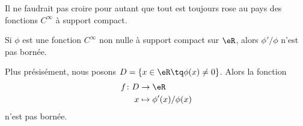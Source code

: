 Il ne faudrait pas croire pour autant que tout est toujours rose au pays des fonctions \(  C^{\infty}\) à support compact.

\begin{proposition}
	Si \( \phi\) est une fonction \(  C^{\infty}\) non nulle à support compact sur \( \eR\), alors \( \phi'/\phi\) n'est pas bornée.

	Plus présisément, nous posons \( D=\{ x\in \eR\tq \phi(x)\neq 0 \}\). Alors la fonction
	\begin{equation}
		\begin{aligned}
			f\colon D & \to \eR                  \\
			x         & \mapsto \phi'(x)/\phi(x)
		\end{aligned}
	\end{equation}
	n'est pas bornée.
\end{proposition}

